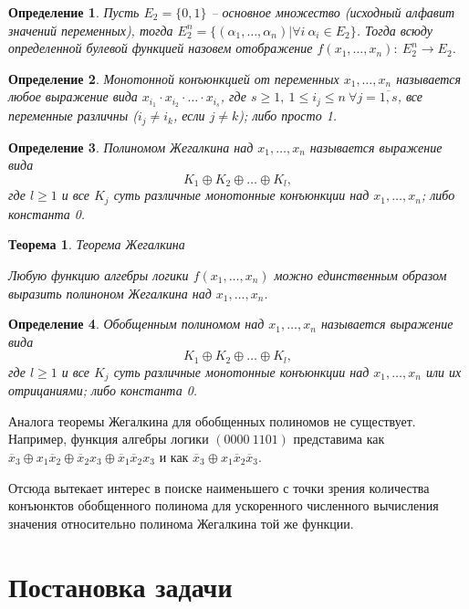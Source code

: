 \documentclass[a4paper,12pt,titlepage,finall]{article}
\newtheorem{definition}{Определение}
\newtheorem{theorem}{Теорема}
\begin{document}
\begin{definition}
    Пусть $E_2 = \{0, 1\}$ -- основное множество (исходный алфавит значений переменных), тогда $E^n_2 = \{(\alpha_1, \ldots, \alpha_n) | \forall i \  \alpha_i \in E_2\}$. Тогда всюду определенной булевой функцией назовем отображение $f(x_1, \ldots, x_n): \  E^n_2 \rightarrow E_2$.
\end{definition}
\begin{definition}
    Монотонной конъюнкцией от переменных $x_1, \ldots, x_n$ называется любое выражение вида $x_{i_1} \cdot x_{i_2} \cdot \ldots \cdot x_{i_s}$, где $s \geq 1, \  1 \leq i_j \leq n \  \forall j = \overline{1, s}$, все переменные различны ($i_j \neq i_k$, если $j \neq k$); либо просто 1.
\end{definition}
\begin{definition}
    Полиномом Жегалкина над $x_1, \ldots, x_n$ называется выражение вида
    $$K_1 \oplus K_2 \oplus \ldots \oplus K_l,$$
    где $l \geq 1$ и все $K_j$ суть различные монотонные конъюнкции над $x_1, \ldots, x_n$; либо константа 0.
\end{definition}
\begin{theorem}{Теорема Жегалкина}

    Любую функцию алгебры логики $f(x_1, \ldots, x_n)$ можно единственным образом выразить полиноном Жегалкина над $x_1, \ldots, x_n$.
\end{theorem}
\begin{definition}
    Обобщенным полиномом над $x_1, \ldots, x_n$ называется выражение вида
    $$K_1 \oplus K_2 \oplus \ldots \oplus K_l,$$
    где $l \geq 1$ и все $K_j$ суть различные монотонные конъюнкции над $x_1, \ldots, x_n$ или их отрицаниями; либо константа 0.
\end{definition}

Аналога теоремы Жегалкина для обобщенных полиномов не существует. Например, функция алгебры логики $(0000\:1101)$ представима как $\overline x_3 \oplus x_1 \overline x_2 \oplus \overline x_2 x_3 \oplus \overline x_1 \overline x_2 x_3$ и как $\overline x_3 \oplus x_1 \overline x_2 \overline x_3$.

Отсюда вытекает интерес в поиске наименьшего с точки зрения количества конъюнктов обобщенного полинома для ускоренного численного вычисления значения относительно полинома Жегалкина той же функции.

\section{Постановка задачи}
\end{document}
